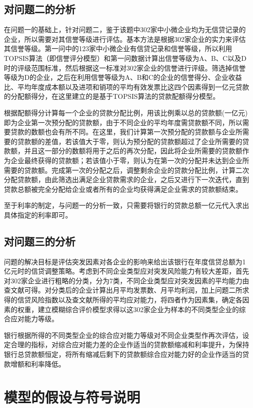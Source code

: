 \documentclass{cumcmthesis}
\begin{document}
\subsection{对问题二的分析}
在问题一的基础上，针对问题二，鉴于该题中302家中小微企业均为无信贷记录的企业，所以需要对其信誉等级进行评估。基本方法是根据302家企业的实力来评估其信誉等级。第一问中的123家中小微企业有信贷记录和信誉等级，所以利用TOPSIS算法（即信誉评分模型）和第一问数据计算出信誉等级为A、B、C以及D时的评级范围标准，然后根据这一标准对302家企业的信誉进行评级。筛选掉信誉等级为D的企业，之后在利用信誉等级为A、B和C的企业的信誉得分、企业收益比、平均年度成本额以及进项和销项的平均有效发票比这四个因素得到一亿元贷款的分配额得分，在这里建立的是基于TOPSIS算法的贷款配额得分模型。

根据配额得分计算每一个企业的贷款分配比例，用该比例乘以总的贷款额(一亿元)即为企业第一次预分配的贷款额，由于不同企业的平均年度需贷款额不同，所以需要贷款的数额也会有所不同。在这里，我们计算第一次预分配的贷款额与企业所需要的贷款额的差值，若该值大于零，则认为预分配的贷款额超过了企业所需要的贷款额，并且这一部分的数额将用于之后的再次分配，因此将企业所需要的贷款额作为企业最终获得的贷款额；若该值小于零，则认为在第一次的分配并未达到企业所需要的贷款额。完成第一次的分配之后，调整剩余企业的贷款分配比例，计算二次分配贷款额，由此筛选出满足企业贷款需求的企业，之后又进行下一次迭代，直到贷款总额被完全分配给企业或者所有的企业均获得满足企业需求的贷款额结束。

至于利率的制定，与问题一的分析一致，只需要将银行的贷款总额一亿元代入求出具体指定的利率即可。

\subsection{对问题三的分析}
问题的解决目标是评估突发因素对各企业的影响来给出该银行在年度信贷总额为1亿元时的信贷调整策略。考虑到不同企业类型应对突发风险能力有较大差距，首先对302家企业进行粗略的分类，分为7类，不同企业类型应对突发因素的平均能力由查文献可得。对分类后的企业计算出月平均发票数、月平均利润，加上问题二所求得的信贷风险指数以及查文献所得的平均应对能力，将四者作为因素集，确定各因素的权重，建立模糊综合评价模型求得以这302家企业为样本的不同类型企业的综合应对能力等级。

银行根据所得的不同类型企业的综合应对能力等级对不同企业类型作再次评估，设定合理的指标，对综合应对能力差的企业作适当的贷款额缩减和利率提升，为保持银行总贷款额恒定，将所有缩减后剩下的贷款额综合应对能力好的企业作适当的贷款增额和利率降低。



\section{模型的假设与符号说明}
\end{document}

